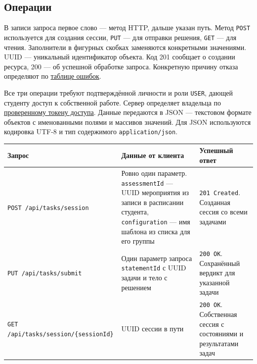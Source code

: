 \documentclass[12pt,a4paper]{article}
\begin{document}
\subsection{Операции}\label{ux43eux43fux435ux440ux430ux446ux438ux438}

\hypertarget{операции}{}

В записи запроса первое слово --- метод HTTP, дальше указан путь. Метод \texttt{POST} используется для создания сессии, \texttt{PUT} --- для отправки решения, \texttt{GET} --- для чтения. Заполнители в фигурных скобках заменяются конкретными значениями. UUID --- уникальный идентификатор объекта. Код 201 сообщает о создании ресурса, 200 --- об успешной обработке запроса. Конкретную причину отказа определяют по {\hyperlink{коды-и-представление-ошибок}{таблице ошибок}}.

Все три операции требуют подтверждённой личности и роли \texttt{USER}, дающей студенту доступ к собственной работе. Сервер определяет владельца по {\href{DOC-06\_Программные\_требования.pdf\#swr-auth-003-проверка-токена-и-роли}{проверенному токену доступа}}. Данные передаются в JSON --- текстовом формате объектов с именованными полями и массивов значений. Для JSON используются кодировка UTF-8 и тип содержимого \texttt{application/\allowbreak{}json}.

{\def\LTcaptype{none} %
\begin{longtable}[]{@{}
  >{\raggedright\arraybackslash}p{}
  >{\raggedright\arraybackslash}p{}
  >{\raggedright\arraybackslash}p{}@{}}
\toprule\noalign{}
\begin{minipage}[b]{\linewidth}\raggedright
Запрос
\end{minipage} & \begin{minipage}[b]{\linewidth}\raggedright
Данные от клиента
\end{minipage} & \begin{minipage}[b]{\linewidth}\raggedright
Успешный ответ
\end{minipage} \\
\midrule\noalign{}
\endhead
\bottomrule\noalign{}
\endlastfoot
\texttt{POST /\allowbreak{}api/\allowbreak{}tasks/\allowbreak{}session} & Ровно один параметр. \texttt{assessmentId} --- UUID мероприятия из записи в расписании студента, \texttt{configuration} --- имя шаблона из списка для его группы & \texttt{201\ Created}. Созданная сессия со всеми задачами \\
\texttt{PUT /\allowbreak{}api/\allowbreak{}tasks/\allowbreak{}submit} & Один параметр запроса \texttt{statementId} с UUID задачи и тело с решением & \texttt{200\ OK}. Сохранённый вердикт для указанной задачи \\
\texttt{GET /\allowbreak{}api/\allowbreak{}tasks/\allowbreak{}session/\allowbreak{}\{sessionId\}} & UUID сессии в пути & \texttt{200\ OK}. Собственная сессия с состояниями и результатами задач \\
\end{longtable}
}
\end{document}
